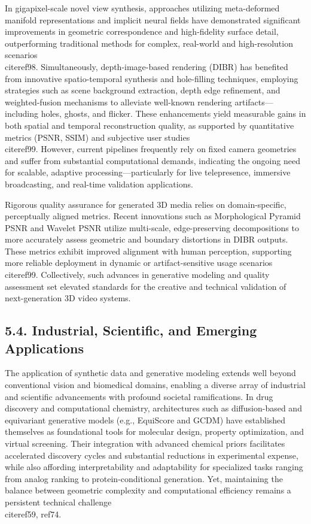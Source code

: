 \documentclass[11pt]{article}
\begin{document}
In gigapixel-scale novel view synthesis, approaches utilizing meta-deformed manifold representations and implicit neural fields have demonstrated significant improvements in geometric correspondence and high-fidelity surface detail, outperforming traditional methods for complex, real-world and high-resolution scenarios~\\cite{ref98}. Simultaneously, depth-image-based rendering (DIBR) has benefited from innovative spatio-temporal synthesis and hole-filling techniques, employing strategies such as scene background extraction, depth edge refinement, and weighted-fusion mechanisms to alleviate well-known rendering artifacts—including holes, ghosts, and flicker. These enhancements yield measurable gains in both spatial and temporal reconstruction quality, as supported by quantitative metrics (PSNR, SSIM) and subjective user studies~\\cite{ref99}. However, current pipelines frequently rely on fixed camera geometries and suffer from substantial computational demands, indicating the ongoing need for scalable, adaptive processing—particularly for live telepresence, immersive broadcasting, and real-time validation applications.

Rigorous quality assurance for generated 3D media relies on domain-specific, perceptually aligned metrics. Recent innovations such as Morphological Pyramid PSNR and Wavelet PSNR utilize multi-scale, edge-preserving decompositions to more accurately assess geometric and boundary distortions in DIBR outputs. These metrics exhibit improved alignment with human perception, supporting more reliable deployment in dynamic or artifact-sensitive usage scenarios~\\cite{ref99}. Collectively, such advances in generative modeling and quality assessment set elevated standards for the creative and technical validation of next-generation 3D video systems.

\subsection{5.4. Industrial, Scientific, and Emerging Applications}

The application of synthetic data and generative modeling extends well beyond conventional vision and biomedical domains, enabling a diverse array of industrial and scientific advancements with profound societal ramifications. In drug discovery and computational chemistry, architectures such as diffusion-based and equivariant generative models (e.g., EquiScore and GCDM) have established themselves as foundational tools for molecular design, property optimization, and virtual screening. Their integration with advanced chemical priors facilitates accelerated discovery cycles and substantial reductions in experimental expense, while also affording interpretability and adaptability for specialized tasks ranging from analog ranking to protein-conditional generation. Yet, maintaining the balance between geometric complexity and computational efficiency remains a persistent technical challenge~\\cite{ref59, ref74}.
\end{document}
